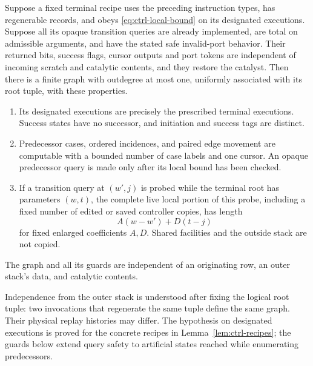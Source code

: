 \begin{lemma}\label{lem:ctrl-local-graph}
Suppose a fixed terminal recipe uses the preceding instruction types,
has regenerable records, and obeys
\eqref{eq:ctrl-local-bound} on its designated executions.  Suppose all
its opaque transition queries are already implemented, are total on
admissible arguments, and have the stated safe invalid-port behavior.
Their returned bits, success flags, cursor outputs and port tokens are
independent of incoming scratch and catalytic contents, and they restore
the catalyst.  Then there is a finite graph with outdegree at
most one, uniformly associated with its root tuple, with these
properties.
\begin{enumerate}
\item Its designated executions are precisely the prescribed terminal
  executions.  Success states have no successor, and initiation and
  success tags are distinct.
\item Predecessor cases, ordered incidences, and paired edge movement
  are computable with a bounded number of case labels and one cursor.
  An opaque predecessor query is made only after its local bound has
  been checked.
\item If a transition query at $(w',j)$ is probed while the terminal
  root has parameters $(w,t)$, the complete live local portion of this
  probe, including a fixed number of edited or saved controller copies,
  has length
  \begin{equation}\label{eq:ctrl-neighbor-bound}
  A(w-w')+D(t-j)
  \end{equation}
  for fixed enlarged coefficients $A,D$.  Shared facilities and the
  outside stack are not copied.
\end{enumerate}
The graph and all its guards are independent of an originating row,
an outer stack's data, and catalytic contents.
\end{lemma}

Independence from the outer stack is understood after fixing the logical
root tuple: two invocations that regenerate the same tuple define the
same graph.  Their physical replay histories may differ.  The hypothesis
on designated executions is proved for the concrete recipes in
Lemma~\ref{lem:ctrl-recipes}; the guards below extend query safety to
artificial states reached while enumerating predecessors.

